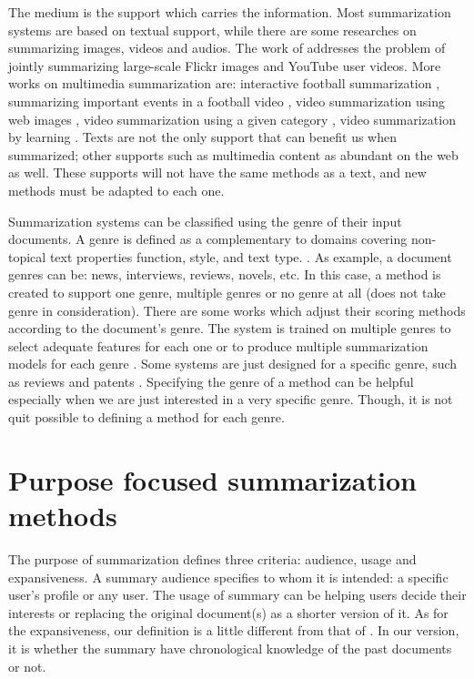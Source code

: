 The medium is the support which carries the information.
Most summarization systems are based on textual support, while there are some researches on summarizing images, videos and audios.
The work of \citet{14-gunhee-al} addresses the problem of jointly summarizing large-scale Flickr images and YouTube user videos. 
More works on multimedia summarization are: interactive football summarization \citep{09-moon}, summarizing important events in a football video \citep{12-zawbaa-al}, video summarization using web images \citep{13-khosla-al}, video summarization using a given category \citep{14-potapov-al}, video summarization by learning \citep{15-gygli-al,18-zho-al}.
Texts are not the only support that can benefit us when summarized; other supports such as multimedia content as abundant on the web as well.
These supports will not have the same methods as a text, and new methods must be adapted to each one.

Summarization systems can be classified using the genre of their input documents. 
A genre is defined as a complementary to domains covering non-topical text properties function, style,
and text type.  \citep{15-vander-al}.
As example, a document genres can be: news, interviews, reviews, novels, etc.
In this case, a method is created to support one genre, multiple genres or no genre at all (does not take genre in consideration).
There are some works which adjust their scoring methods according to the document's genre.
The system is trained on multiple genres to select adequate features for each one \citep{07-goldstein-al} or to produce multiple summarization models for each genre \citep{10-yatsko-al}. 
Some systems are just designed for a specific genre, such as reviews \citep{09-zhan-al} and patents \citep{19-girthana-swamynathan}.
Specifying the genre of a method can be helpful especially when we are just interested in a very specific genre. 
Though, it is not quit possible to defining a method for each genre. 


\section{Purpose focused summarization methods}

The purpose of summarization defines three criteria: audience, usage and expansiveness.
A summary audience specifies to whom it is intended: a specific user's profile or any user.  
The usage of summary can be helping users decide their interests or replacing the original document(s) as a shorter version of it.
As for the expansiveness, our definition is a little different from that of \citet{98-hovy-lin}. 
In our version, it is whether the summary have chronological knowledge of the past documents or not.

